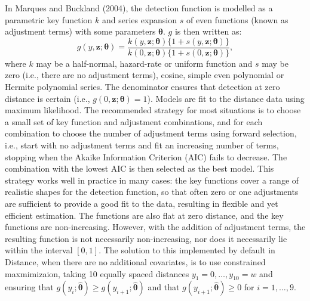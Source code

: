 \documentclass[useAMS,referee]{biom}
\begin{document}
In Marques and Buckland (2004), the detection function is modelled as a parametric key function $k$ and series expansion $s$ of even functions (known as adjustment terms) with some parameters $\bm{\theta}$. $g$ is then written as:
\begin{equation*}
g(y, \mathbf{z}; \bm{\theta}) = \frac{k(y, \mathbf{z}; \bm{\theta}) \{1+s(y, \mathbf{z}; \bm{\theta})\}}{k(0, \mathbf{z}; \bm{\theta}) \{1+s(0, \mathbf{z}; \bm{\theta})\}},
\end{equation*}
where $k$ may be a half-normal, hazard-rate or uniform function and $s$ may be zero (i.e., there are no adjustment terms), cosine, simple even polynomial or Hermite polynomial series. The denominator ensures that detection at zero distance is certain (i.e., $g(0, \mathbf{z};\bm{\theta})=1$).  Models are fit to the distance data using maximum likelihood.  The recommended strategy for most situations is to choose a small set of key function and adjustment combinations, and for each combination to choose the number of adjustment terms using forward selection, i.e., start with no adjustment terms and fit an increasing number of terms, stopping when the Akaike Information Criterion (AIC) fails to decrease.  The combination with the lowest AIC is then selected as the best model.  This strategy works well in practice in many cases: the key functions cover a range of realistic shapes for the detection function, so that often zero or one adjustments are sufficient to provide a good fit to the data, resulting in flexible and yet efficient estimation.  The functions are also flat at zero distance, and the key functions are non-increasing.  However, with the addition of adjustment terms, the resulting function is not necessarily non-increasing, nor does it necessarily lie within the interval $[0,1]$.  The solution to this implemented by default in Distance, when there are no additional covariates, is to use constrained maxmimizaion, taking 10 equally spaced distances $y_1=0, \ldots , y_{10}=w$ and ensuring that $g(y_i;\bm{\hat{\theta}})\geq g(y_{i+1}; \bm{\hat{\theta}})$ and that $g(y_{i+1};\bm{\hat{\theta}})\geq 0$ for $i=1,\ldots,9$.
\end{document}
